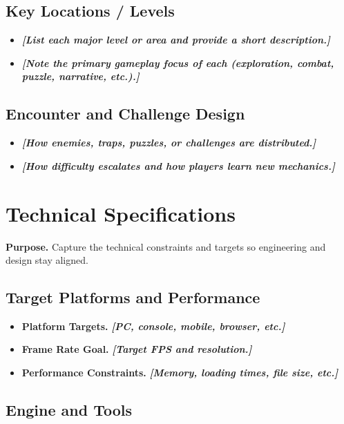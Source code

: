 \documentclass[12pt]{article}
\newcommand{\placeholder}[1]{\textbf{\textit{[#1]}}}
\begin{document}
\subsection{Key Locations / Levels}

\begin{itemize}
    \item \placeholder{List each major level or area and provide a short description.}
    \item \placeholder{Note the primary gameplay focus of each (exploration, combat, puzzle, narrative, etc.).}
\end{itemize}

\subsection{Encounter and Challenge Design}

\begin{itemize}
    \item \placeholder{How enemies, traps, puzzles, or challenges are distributed.}
    \item \placeholder{How difficulty escalates and how players learn new mechanics.}
\end{itemize}

\section{Technical Specifications}

\textbf{Purpose.} Capture the technical constraints and targets so engineering and design stay aligned.

\subsection{Target Platforms and Performance}

\begin{itemize}
    \item \textbf{Platform Targets.} \placeholder{PC, console, mobile, browser, etc.}
    \item \textbf{Frame Rate Goal.} \placeholder{Target FPS and resolution.}
    \item \textbf{Performance Constraints.} \placeholder{Memory, loading times, file size, etc.}
\end{itemize}

\subsection{Engine and Tools}
\end{document}
